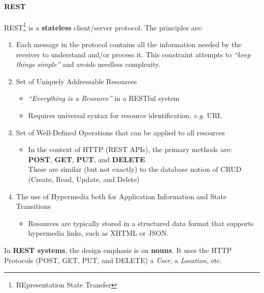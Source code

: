 \paragraph{REST}

REST\footnote{REpresentation State Transfer} is a {\bf stateless} client/server protocol. The principles are:
\begin{enumerate}
 \item Each message in the protocol contains all the information needed by the receiver to understand and/or process it. This constraint attempts to {\it ``keep things simple''} and avoids needless complexity.
 \item Set of Uniquely Addressable Resources
 \begin{itemize}
  \item {\it ``Everything is a Resource''} in a RESTful system
  \item Requires universal syntax for resource identification, {\it e.g.} URI.
 \end{itemize}
 \item Set of Well-Defined Operations that can be applied to all resources
 \begin{itemize}
  \item In the context of HTTP (REST APIs), the primary methods are: \\
  {\bf POST}, {\bf GET}, {\bf PUT}, and {\bf DELETE} \\
  These are similar (but not exactly) to the database notion of CRUD (Create, Read, Update, and Delete)
 \end{itemize}
 \item The use of Hypermedia both for Application Information and State Transitions
 \begin{itemize}
  \item Resources are typically stored in a structured data format that supports hypermedia links, such as XHTML or JSON.
 \end{itemize}
\end{enumerate}
In {\bf REST systems}, the design emphasis is on {\bf nouns}. It uses the HTTP Protocols (POST, GET, PUT, and DELETE) a {\it User}, a {\it Location}, etc. 
